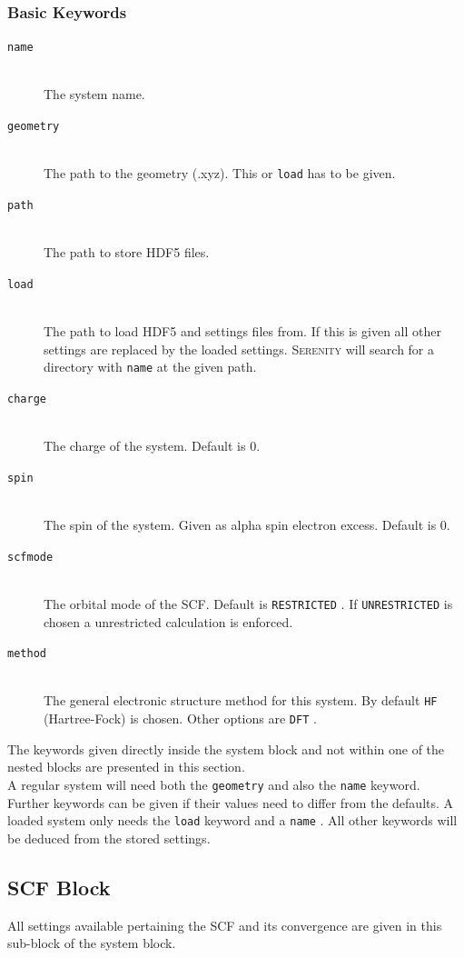 \documentclass[bibliography=totocnumbered,a4paper,10pt,oneside]{scrbook}
\newcommand{
\serenity}{\textsc{Serenity}\xspace}
\newcommand{\ttt}[1]{%
  \begingroup\setlength{\fboxsep}{1pt}%
  \colorbox{serenity-green!30}{\texttt{\hspace*{2pt}\vphantom{(g}#1\hspace*{2pt}}}%
  \endgroup
}
\begin{document}
\subsubsection{Basic Keywords}
\begin{description}
 \item [\texttt{name}]\hfill \\
   The system name.
 \item [\texttt{geometry}]\hfill \\
   The path to the geometry (.xyz). This or \ttt{load} has to be given.
   \item [\texttt{path}]\hfill \\
   The path to store HDF5 files.
   \item [\texttt{load}]\hfill \\
   The path to load HDF5 and settings files from. If this is given all other settings are replaced by the loaded settings. \serenity will search 
   for a directory with \ttt{name} at the given path.
   \item [\texttt{charge}]\hfill \\
   The charge of the system. Default is $0$.
   \item [\texttt{spin}]\hfill \\
   The spin of the system. Given as alpha spin electron excess. Default is $0$.
 \item [\texttt{scfmode}]\hfill \\
   The orbital mode of the SCF. Default is \ttt{RESTRICTED}. If \ttt{UNRESTRICTED} is chosen a unrestricted calculation is enforced.
  \item [\texttt{method}]\hfill \\
  The general electronic structure method for this system. By default \ttt{HF} (Hartree-Fock) is chosen. Other options are \ttt{DFT}.
\end{description}

The keywords given directly inside the system block and not within one of the nested blocks are presented
in this section.\\
A regular system will need both the \ttt{geometry} and also the \ttt{name} keyword.
Further keywords can be given if their values need to differ from the defaults.
A loaded system only needs the \ttt{load} keyword and a \ttt{name}.
All other keywords will be deduced from the stored settings.

\subsection{SCF Block}\label{sec:system:scf}
All settings available pertaining the SCF and its convergence are given in this sub-block of the system block.
\end{document}
